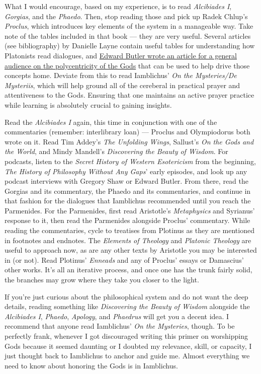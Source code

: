 \documentclass[
]{book}
\begin{document}
What I would encourage, based on my experience, is to read \emph{Alcibiades I}, \emph{Gorgias}, and the \emph{Phaedo}. Then, stop reading those and pick up Radek Chlup's \emph{Proclus}, which introduces key elements of the system in a manageable way. Take note of the tables included in that book --- they are very useful. Several articles (see bibliography) by Danielle Layne contain useful tables for understanding how Platonists read dialogues, and \href{https://www.academia.edu/30296722/_Polycentric_Polytheism_pp._37-40_in_Witches_and_Pagans_32_June_2016}{Edward Butler wrote an article for a general audience on the polycentricity of the Gods} that can be used to help drive those concepts home. Deviate from this to read Iamblichus' \emph{On the Mysteries/De Mysteriis}, which will help ground all of the cereberal in practical prayer and attentiveness to the Gods. Ensuring that one maintains an active prayer practice while learning is absolutely crucial to gaining insights.

Read the \emph{Alcibiades I} again, this time in conjunction with one of the commentaries (remember: interlibrary loan) --- Proclus and Olympiodorus both wrote on it. Read Tim Addey's \emph{The Unfolding Wings}, Sallust's \emph{On the Gods and the World}, and Mindy Mandell's \emph{Discovering the Beauty of Wisdom}. For podcasts, listen to the \emph{Secret History of Western Esotericism} from the beginning, \emph{The History of Philosophy Without Any Gaps}' early episodes, and look up any podcast interviews with Gregory Shaw or Edward Butler. From there, read the Gorgias and its commentary, the Phaedo and its commentaries, and continue in that fashion for the dialogues that Iamblichus recommended until you reach the Parmenides. For the Parmenides, first read Aristotle's \emph{Metaphysics} and Syrianus' response to it, then read the Parmenides alongside Proclus' commentary. While reading the commentaries, cycle to treatises from Plotinus as they are mentioned in footnotes and endnotes. The \emph{Elements of Theology} and \emph{Platonic Theology} are useful to approach now, as are any other texts by Aristotle you may be interested in (or not). Read Plotinus' \emph{Enneads} and any of Proclus' essays or Damascius' other works. It's all an iterative process, and once one has the trunk fairly solid, the branches may grow where they take you closer to the light.

If you're just curious about the philosophical system and do not want the deep details, reading something like \emph{Discovering the Beauty of Wisdom} alongside the \emph{Alcibiades I}, \emph{Phaedo}, \emph{Apology}, and \emph{Phaedrus} will get you a decent idea. I recommend that anyone read Iamblichus' \emph{On the Mysteries}, though. To be perfectly frank, whenever I got discouraged writing this primer on worshipping Gods because it seemed daunting or I doubted my relevance, skill, or capacity, I just thought back to Iamblichus to anchor and guide me. Almost everything we need to know about honoring the Gods is in Iamblichus.
\end{document}

